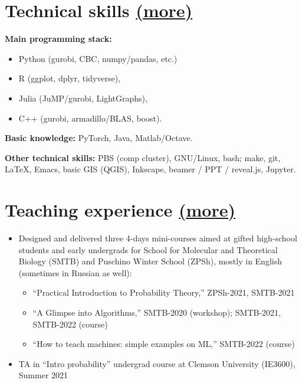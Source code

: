 \documentclass[11pt, a4paper]{article} \usepackage{geometry} %
\newcommand{\mhref}[1]{\hfill\href{#1}{\small (more\faExternalLink*)}}
\begin{document}
\begin{minipage}[t]{0.49\textwidth}
   \section*{Technical skills \mhref{https://www.bochkarev.io/notes/stack/}}
   \textbf{Main programming stack:}
   \begin{itemize}
     \itemsep0pt
   \item Python (gurobi, CBC, numpy/pandas, etc.)
     \item R (ggplot, dplyr, tidyverse),
     \item Julia (JuMP/gurobi, LightGraphs),
     \item C++ (gurobi, armadillo/BLAS, boost).
   \end{itemize}\vspace{0.5em}
   \textbf{Basic knowledge:} PyTorch, Java, Matlab/Octave. \vspace{1em}

   \textbf{Other technical skills:}
   PBS (comp cluster), GNU/Linux, bash; make, git, \LaTeX, Emacs, basic GIS
   (QGIS), Inkscape, beamer / PPT / reveal.js, Jupyter.
   \end{minipage}
   \vspace{1em}

   \section*{Teaching experience \mhref{https://www.bochkarev.io/teaching/}}
   \begin{itemize}
     \itemsep0pt
      \item Designed and delivered three 4-days mini-courses aimed at gifted
      high-school students and early undergrads for School for Molecular and
      Theoretical Biology (SMTB) and Puschino Winter School (ZPSh), mostly in English
      (sometimes in Russian as well):
      \begin{itemize}
        \itemsep0pt
        \item ``Practical Introduction to Probability Theory,'' ZPSh-2021,
          SMTB-2021
        \item ``A Glimpse into Algorithms,'' SMTB-2020 (workshop); SMTB-2021, SMTB-2022 (course)
        \item ``How to teach machines: simple examples on ML,'' SMTB-2022 (course)
      \end{itemize}
      \item TA in ``Intro probability'' undergrad course at Clemson University
        (IE3600), Summer 2021
\end{itemize}
\end{document}
